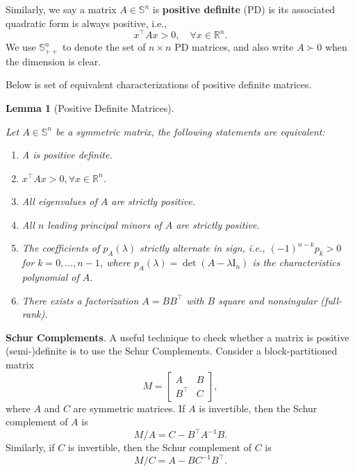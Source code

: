\documentclass[
]{book}
\newtheorem{lemma}{Lemma}[chapter]
\theoremstyle{definition}
\theoremstyle{definition}
\theoremstyle{definition}
\theoremstyle{definition}
\theoremstyle{remark}
\begin{document}
Similarly, we say a matrix \(A \in \mathbb{S}^{n}\) is \textbf{positive definite} (PD) is its associated quadratic form is always positive, i.e.,
\[
x^\top A x > 0, \quad \forall x \in \mathbb{R}^{n}.
\]
We use \(\mathbb{S}^{n}_{++}\) to denote the set of \(n \times n\) PD matrices, and also write \(A \succ 0\) when the dimension is clear.

Below is set of equivalent characterizations of positive definite matrices.

\begin{lemma}[Positive Definite Matrices]
\protect\hypertarget{lem:PositiveDefinite}{}\label{lem:PositiveDefinite}

Let \(A \in \mathbb{S}^{n}\) be a symmetric matrix, the following statements are equivalent:

\begin{enumerate}
\def\labelenumi{\arabic{enumi}.}
\item
  A is positive definite.
\item
  \(x^\top A x > 0, \forall x \in \mathbb{R}^{n}\).
\item
  All eigenvalues of \(A\) are strictly positive.
\item
  All \(n\) leading principal minors of \(A\) are strictly positive.
\item
  The coefficients of \(p_A(\lambda)\) strictly alternate in sign, i.e., \((-1)^{n-k} p_k > 0\) for \(k=0,\dots,n-1\), where \(p_A(\lambda) = \det (A - \lambda \mathrm{I}_n)\) is the characteristics polynomial of \(A\).
\item
  There exists a factorization \(A = BB^\top\) with \(B\) square and nonsingular (full-rank).
\end{enumerate}

\end{lemma}

\textbf{Schur Complements}. A useful technique to check whether a matrix is positive (semi-)definite is to use the Schur Complements. Consider a block-partitioned matrix
\begin{equation}
M = \begin{bmatrix} A & B \\ B^\top& C \end{bmatrix},
\label{eq:block-mat-M}
\end{equation}
where \(A\) and \(C\) are symmetric matrices.
If \(A\) is invertible, then the Schur complement of \(A\) is
\[
M / A = C - B^\top A^{-1}B.
\]
Similarly, if \(C\) is invertible, then the Schur complement of \(C\) is
\[
M / C = A - B C^{-1}B^\top.
\]
\end{document}
